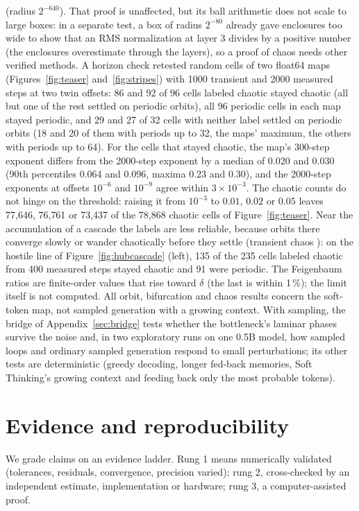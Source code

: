 \documentclass[11pt,letterpaper]{article}
\begin{document}
(radius $2^{-640}$). That proof is unaffected, but its ball arithmetic does not scale to large boxes: in a separate
test, a box of radius $2^{-80}$ already gave enclosures too wide to show that an RMS normalization at layer 3
divides by a positive number (the enclosures overestimate through the layers), so a proof of chaos needs other
verified methods. A horizon check retested
random cells of two float64 maps (Figures~\ref{fig:teaser} and~\ref{fig:stripes}) with 1000 transient and 2000
measured steps at two twin offsets: 86 and 92 of 96 cells labeled chaotic stayed chaotic (all but one of the rest
settled on periodic orbits), all 96 periodic cells in each map stayed periodic, and 29 and 27 of 32 cells with neither
label settled on periodic orbits (18 and 20 of them with periods up to 32, the maps' maximum, the others with periods
up to 64). For the cells that stayed chaotic, the map's 300-step exponent differs from the 2000-step exponent by a
median of 0.020 and 0.030 (90th percentiles 0.064 and 0.096, maxima 0.23 and 0.30), and the 2000-step exponents at
offsets $10^{-6}$ and $10^{-9}$ agree within $3\times10^{-3}$. The chaotic counts do not hinge on the threshold:
raising it from $10^{-3}$ to $0.01$, $0.02$ or $0.05$ leaves 77{,}646, 76{,}761 or 73{,}437 of the 78{,}868 chaotic
cells of Figure~\ref{fig:teaser}. Near the accumulation of a cascade the labels are less reliable, because orbits there converge
slowly or wander chaotically before they settle (transient chaos \cite{grebogi1983crises,lai2011transient}): on
the hostile line of Figure~\ref{fig:hubcascade} (left), 135 of the 235 cells labeled chaotic from 400 measured steps
stayed chaotic and 91 were periodic. The Feigenbaum ratios are
finite-order values that rise toward $\delta$ (the last is within 1\,\%); the limit itself is not computed. All
orbit, bifurcation and chaos results concern the soft-token map, not sampled generation with a growing context. With
sampling, the bridge of Appendix~\ref{sec:bridge} tests whether the bottleneck's laminar phases survive the noise and,
in two exploratory runs on one 0.5B model, how sampled loops and ordinary sampled generation respond to small
perturbations; its other tests are deterministic (greedy decoding, longer fed-back memories, Soft Thinking's growing
context and feeding back only the most probable tokens).

\section{Evidence and reproducibility}
\label{sec:evidence}
We grade claims on an evidence ladder. Rung 1 means numerically validated (tolerances, residuals, convergence,
precision varied); rung 2, cross-checked by an independent estimate, implementation or hardware; rung 3, a
computer-assisted proof.
\end{document}
